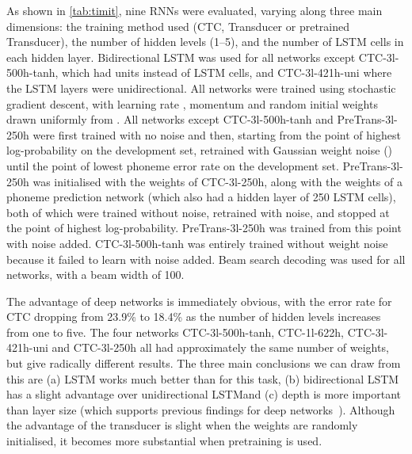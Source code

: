 \documentclass{article}
\newcommand{\tref}[1]{\cref{tab:#1}}
\begin{document}
As shown in \tref{timit}, nine RNNs were evaluated, varying along three main dimensions: the training method used (CTC, Transducer or pretrained Transducer), the number of hidden levels (1--5), and the number of LSTM cells in each hidden layer. 
Bidirectional LSTM was used for all networks except CTC-3l-500h-tanh, which had  units instead of LSTM cells, and CTC-3l-421h-uni where the LSTM layers were unidirectional.
All networks were trained using stochastic gradient descent, with learning rate , momentum  and random initial weights drawn uniformly from .
All networks except CTC-3l-500h-tanh and PreTrans-3l-250h were first trained with no noise and then, starting from the point of highest log-probability on the development set, retrained with Gaussian weight noise () until the point of lowest phoneme error rate on the development set.
PreTrans-3l-250h was initialised with the weights of CTC-3l-250h, along with the weights of a phoneme prediction network (which also had a hidden layer of 250 LSTM cells), both of which were trained without noise, retrained with noise, and stopped at the point of highest log-probability.
PreTrans-3l-250h was trained from this point with noise added.
CTC-3l-500h-tanh was entirely trained without weight noise because it failed to learn with noise added.
Beam search decoding was used for all networks, with a beam width of 100.


The advantage of deep networks is immediately obvious, with the error rate for CTC dropping from 23.9\% to 18.4\% as the number of hidden levels increases from one to five.
The four networks CTC-3l-500h-tanh, CTC-1l-622h, CTC-3l-421h-uni and CTC-3l-250h all had approximately the same number of weights, but give radically different results.
The three main conclusions we can draw from this are (a) LSTM works much better than  for this task, (b) bidirectional LSTM has a slight advantage over unidirectional LSTMand (c) depth is more important than layer size (which supports previous findings for deep networks~\cite{5704567}).
Although the advantage of the transducer is slight when the weights are randomly initialised, it becomes more substantial when pretraining is used.
\end{document}
